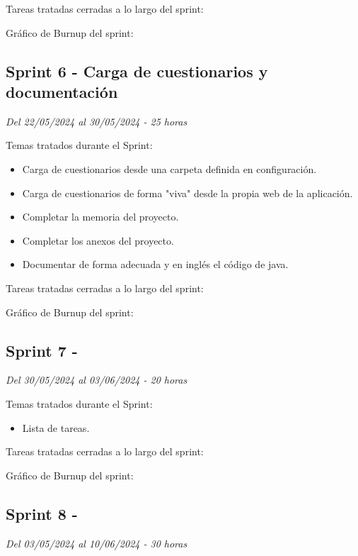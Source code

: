 Tareas tratadas cerradas a lo largo del sprint:

Gráfico de Burnup del sprint:

\subsection{Sprint 6 - Carga de cuestionarios y documentación}
\textit{Del 22/05/2024 al 30/05/2024 - 25 horas}

Temas tratados durante el Sprint:
\begin{itemize}
	\item
	Carga de cuestionarios desde una carpeta definida en configuración.
	\item
	Carga de cuestionarios de forma "viva" desde la propia web de la aplicación.
	\item
	Completar la memoria del proyecto.
	\item
	Completar los anexos del proyecto.
	\item
	Documentar de forma adecuada y en inglés el código de java.
\end{itemize}

Tareas tratadas cerradas a lo largo del sprint:

Gráfico de Burnup del sprint:


\subsection{Sprint 7 - }
\textit{Del 30/05/2024 al 03/06/2024 - 20 horas}

Temas tratados durante el Sprint:
\begin{itemize}
	\item
	Lista de tareas.
\end{itemize}

Tareas tratadas cerradas a lo largo del sprint:

Gráfico de Burnup del sprint:


\subsection{Sprint 8 - }
\textit{Del 03/05/2024 al 10/06/2024 - 30 horas}

